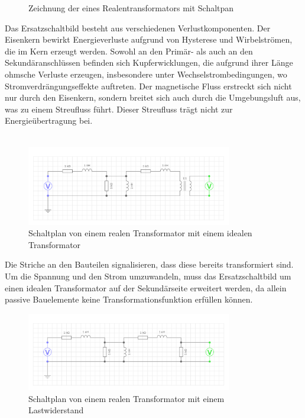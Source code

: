 \begin{enumerate}[label=\alph*)]
\begin{figure}[h!]
          \caption{Zeichnung der eines Realentransformators mit Schaltpan }\label{img/2.1.2.4}
        \end{figure}
        Das Ersatzschaltbild besteht aus verschiedenen Verlustkomponenten. Der Eisenkern bewirkt Energieverluste aufgrund von Hysterese und Wirbelströmen, die im Kern erzeugt werden. Sowohl an den Primär- als auch an den Sekundäranschlüssen befinden sich Kupferwicklungen, die aufgrund ihrer Länge ohmsche Verluste erzeugen, insbesondere unter Wechselstrombedingungen, wo Stromverdrängungseffekte auftreten. Der magnetische Fluss erstreckt sich nicht nur durch den Eisenkern, sondern breitet sich auch durch die Umgebungsluft aus, was zu einem Streufluss führt. Dieser Streufluss trägt nicht zur Energieübertragung bei.\\ \ \\
        \begin{figure}[h!]
          \begin{center}
            \includegraphics[width=0.8\textwidth]{img/2.1.2.2.png}
          \end{center}
          \caption{Schaltplan von einem realen Transformator mit einem idealen Transformator}\label{img/2.1.2.2}
        \end{figure}
        Die Striche an den Bauteilen signalisieren, dass diese bereits transformiert sind. Um die Spannung und den Strom umzuwandeln, muss das Ersatzschaltbild um einen idealen Transformator auf der Sekundärseite erweitert werden, da allein passive Bauelemente keine Transformationsfunktion erfüllen können.\\
        \begin{figure}[h!]
          \begin{center}
            \includegraphics[width=0.8\textwidth]{img/2.1.2.3.png}
          \end{center}
          \caption{Schaltplan von einem realen Transformator mit einem Lastwiderstand}\label{img/2.1.2.3}
        \end{figure}


\end{enumerate}
